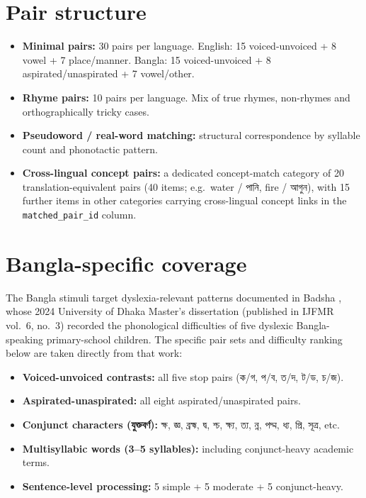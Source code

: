 \section*{Pair structure}

\begin{itemize}
    \item \textbf{Minimal pairs:} 30 pairs per language. English: 15 voiced-unvoiced + 8 vowel + 7 place/manner. Bangla: 15 voiced-unvoiced + 8 aspirated/unaspirated + 7 vowel/other.
    \item \textbf{Rhyme pairs:} 10 pairs per language. Mix of true rhymes, non-rhymes and orthographically tricky cases.
    \item \textbf{Pseudoword / real-word matching:} structural correspondence by syllable count and phonotactic pattern.
    \item \textbf{Cross-lingual concept pairs:} a dedicated concept-match category of 20 translation-equivalent pairs (40 items; e.g.\ water / {\banglafont পানি}, fire / {\banglafont আগুন}), with 15 further items in other categories carrying cross-lingual concept links in the \texttt{matched\_pair\_id} column.
\end{itemize}

\section*{Bangla-specific coverage}

The Bangla stimuli target dyslexia-relevant patterns documented in Badsha \cite{badsha2024mall}, whose 2024 University of Dhaka Master's dissertation (published in IJFMR vol.\ 6, no.\ 3) recorded the phonological difficulties of five dyslexic Bangla-speaking primary-school children. The specific pair sets and difficulty ranking below are taken directly from that work:
\begin{itemize}
    \item \textbf{Voiced-unvoiced contrasts:} all five stop pairs ({\banglafont ক/গ}, {\banglafont প/ব}, {\banglafont ত/দ}, {\banglafont ট/ড}, {\banglafont চ/জ}).
    \item \textbf{Aspirated-unaspirated:} all eight aspirated/unaspirated pairs.
    \item \textbf{Conjunct characters ({\banglafont যুক্তবর্ণ}):} {\banglafont ক্ষ}, {\banglafont জ্ঞ}, {\banglafont ব্রহ্ম}, {\banglafont দ্ব}, {\banglafont শ্চ}, {\banglafont ক্ষ্য}, {\banglafont ত্য}, {\banglafont ন্ন}, {\banglafont পদ্ম}, {\banglafont ধ্য}, {\banglafont প্রি}, {\banglafont সূত্র}, etc.
    \item \textbf{Multisyllabic words (3--5 syllables):} including conjunct-heavy academic terms.
    \item \textbf{Sentence-level processing:} 5 simple + 5 moderate + 5 conjunct-heavy.
\end{itemize}

